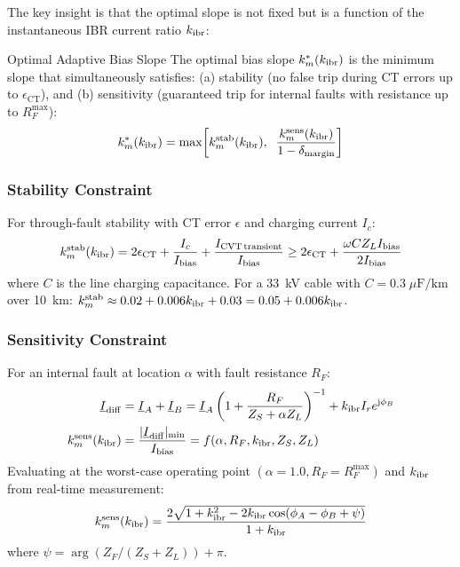 The key insight is that the optimal slope is not fixed but is a function
of the instantaneous IBR current ratio $k_{\mathrm{ibr}}$:

\begin{thesisdef}{Optimal Adaptive Bias Slope}
The optimal bias slope $k_m^\ast(k_{\mathrm{ibr}})$ is the minimum slope that
simultaneously satisfies:
(a) stability (no false trip during CT errors up to $\epsilon_\mathrm{CT}$), and
(b) sensitivity (guaranteed trip for internal faults with resistance up
to $R_F^\mathrm{max}$):
\begin{equation}
  k_m^\ast(k_{\mathrm{ibr}}) = \max\!\left[k_m^\mathrm{stab}(k_{\mathrm{ibr}}),\;\;
                              \frac{k_m^\mathrm{sens}(k_{\mathrm{ibr}})}{1 - \delta_\mathrm{margin}}\right]
  \label{eq:ch4_km_star}
\end{equation}
\end{thesisdef}

\subsubsection{Stability Constraint}

For through-fault stability with CT error $\epsilon$ and
charging current $I_c$:
\begin{equation}
  k_m^\mathrm{stab}(k_{\mathrm{ibr}}) = 2\epsilon_\mathrm{CT}
    + \frac{I_c}{I_\mathrm{bias}} + \frac{I_\mathrm{CVT\,transient}}{I_\mathrm{bias}}
    \geq 2\epsilon_\mathrm{CT} + \frac{\omega C Z_L I_\mathrm{bias}}{2I_\mathrm{bias}}
  \label{eq:ch4_km_stab}
\end{equation}
where $C$ is the line charging capacitance. For a 33~kV cable with
$C = 0.3\;\mu\mathrm{F/km}$ over 10~km:
$k_m^\mathrm{stab} \approx 0.02 + 0.006k_{\mathrm{ibr}} + 0.03 = 0.05 + 0.006k_{\mathrm{ibr}}$.

\subsubsection{Sensitivity Constraint}

For an internal fault at location $\alpha$ with fault resistance $R_F$:
\begin{align}
  \underline{I}_\mathrm{diff} &= \underline{I}_A + \underline{I}_B
  = \underline{I}_A\left(1 + \frac{R_F}{Z_S + \alpha Z_L}\right)^{-1}
    + k_{\mathrm{ibr}} I_r e^{\mathrm{j}\phi_B}
  \label{eq:ch4_idiff_rf} \\
  k_m^\mathrm{sens}(k_{\mathrm{ibr}}) &=
  \frac{|\underline{I}_\mathrm{diff}|_{\min}}{I_\mathrm{bias}}
  = f(\alpha, R_F, k_{\mathrm{ibr}}, Z_S, Z_L)
  \label{eq:ch4_km_sens}
\end{align}
Evaluating at the worst-case operating point $(\alpha = 1.0, R_F = R_F^\mathrm{max})$
and $k_{\mathrm{ibr}}$ from real-time measurement:
\begin{equation}
  k_m^\mathrm{sens}(k_{\mathrm{ibr}}) = \frac{2\sqrt{1 + k_{\mathrm{ibr}}^2
    - 2k_{\mathrm{ibr}}\cos(\phi_A - \phi_B + \psi)}}{1 + k_{\mathrm{ibr}}}
  \label{eq:ch4_km_sens2}
\end{equation}
where $\psi = \arg(Z_F/(Z_S + Z_L)) + \pi$.

